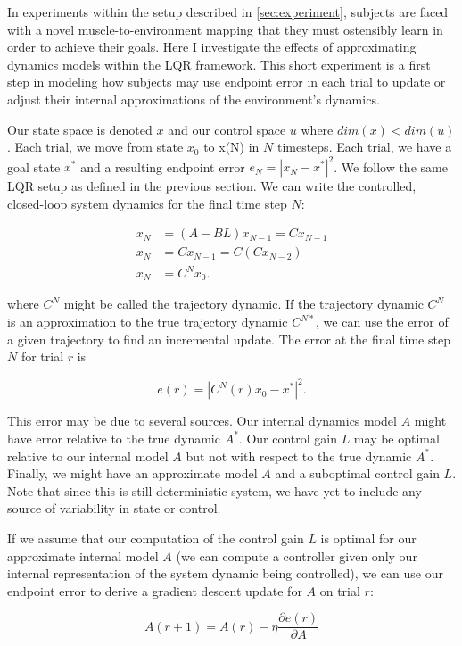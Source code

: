 \documentclass[
  a4paper,
]{article}
\begin{document}
In experiments within the setup described in \cref{sec:experiment},
subjects are faced with a novel muscle-to-environment mapping that they
must ostensibly learn in order to achieve their goals. Here I
investigate the effects of approximating dynamics models within the LQR
framework. This short experiment is a first step in modeling how
subjects may use endpoint error in each trial to update or adjust their
internal approximations of the environment's dynamics.

Our state space is denoted \(x\) and our control space \(u\) where
\(dim(x) < dim(u)\). Each trial, we move from state \(x_0\) to x(N) in
\(N\) timesteps. Each trial, we have a goal state \(x^*\) and a
resulting endpoint error \(e_N = |x_N - x^*|^2\). We follow the same LQR
setup as defined in the previous section. We can write the controlled,
closed-loop system dynamics for the final time step \(N\):

\[
\begin{aligned}
x_N &= (A - BL)x_{N-1} = Cx_{N-1} \\
x_N &= Cx_{N-1} = C(Cx_{N-2}) \\
x_N &= C^Nx_0.
\end{aligned}
\]

where \(C^N\) might be called the trajectory dynamic. If the trajectory
dynamic \(C^N\) is an approximation to the true trajectory dynamic
\(C^{N*}\), we can use the error of a given trajectory to find an
incremental update. The error at the final time step \(N\) for trial
\(r\) is

\[
e(r) = |C^N(r)x_{0} - x^*|^2.
\]

This error may be due to several sources. Our internal dynamics model
\(A\) might have error relative to the true dynamic \(A^*\). Our control
gain \(L\) may be optimal relative to our internal model \(A\) but not
with respect to the true dynamic \(A^*\). Finally, we might have an
approximate model \(A\) and a suboptimal control gain \(L\). Note that
since this is still deterministic system, we have yet to include any
source of variability in state or control.

If we assume that our computation of the control gain \(L\) is optimal
for our approximate internal model \(A\) (we can compute a controller
given only our internal representation of the system dynamic being
controlled), we can use our endpoint error to derive a gradient descent
update for \(A\) on trial \(r\):

\[
A(r+1) = A(r) - \eta\frac{\partial{e(r)}}{\partial{A}}
\]
\end{document}
